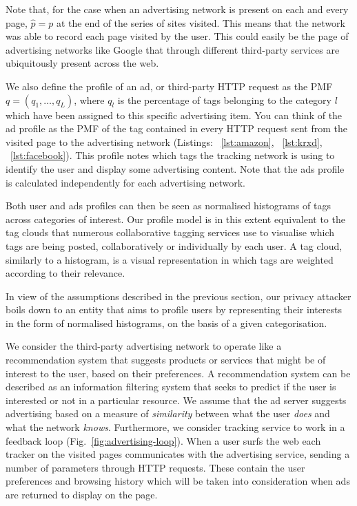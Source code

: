 Note that, for the case when an advertising network is present on each and every page, $\hat{p} = p$ at the end of the series of sites visited. This means that the network was able to record each page visited by the user. This could easily be the page of advertising networks like Google that through different third-party services are ubiquitously present across the web.

We also define the profile of an ad, or third-party HTTP request as the PMF $q =(q_1,\ldots, q_L)$, where $q_l$ is the percentage of tags belonging to the category $l$ which have been assigned to this specific advertising item. You can think of the ad profile as the PMF of the tag contained in every HTTP request sent from the visited page to the advertising network (Listings: ~\ref{lst:amazon}, ~\ref{lst:krxd}, ~\ref{lst:facebook}). This profile notes which tags the tracking network is using to identify the user and display some advertising content. Note that the ads profile is calculated independently for each advertising network.

Both user and ads profiles can then be seen as normalised histograms of tags across categories of interest. Our profile model is in this extent equivalent to the tag clouds that numerous collaborative tagging services use to visualise which tags are being posted, collaboratively or individually by each user. A tag cloud, similarly to a histogram, is a visual representation in which tags are weighted according to their relevance.

In view of the assumptions described in the previous section, our privacy attacker boils down to an entity that aims to profile users by representing their interests in the form of normalised histograms, on the basis of a given categorisation.

We consider the third-party advertising network to operate like a recommendation system that suggests products or services that might be of interest to the user, based on their preferences. A recommendation system can be described as an information filtering system that seeks to predict if the user is interested or not in a particular resource. We assume that the ad server suggests advertising based on a measure of \emph{similarity} between what the user \emph{does} and what the network \emph{knows}. Furthermore, we consider tracking service to work in a feedback loop (Fig.~\ref{fig:advertising-loop}). When a user surfs the web each tracker on the visited pages communicates with the advertising service, sending a number of parameters through HTTP requests. These contain the user preferences and browsing history which will be taken into consideration when ads are returned to display on the page.

